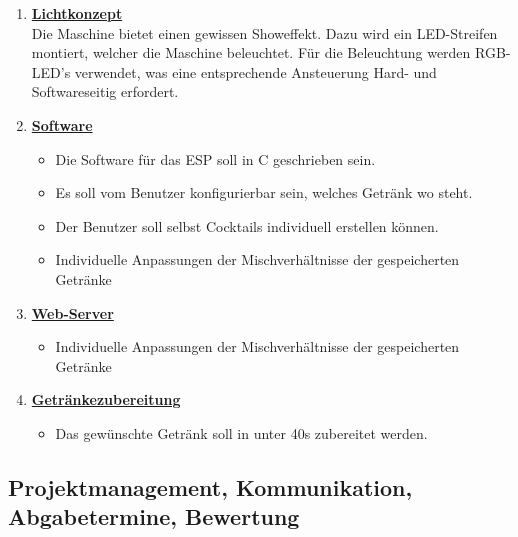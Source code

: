 \begin{enumerate}

\item \underline{\textbf{Lichtkonzept}}\mbox{}\\

Die Maschine bietet einen gewissen Showeffekt. Dazu wird ein LED-Streifen montiert, welcher die Maschine beleuchtet. Für die Beleuchtung werden RGB-LED's verwendet, was eine entsprechende Ansteuerung Hard- und Softwareseitig erfordert.\\

\item \underline{\textbf{Software}}\mbox{}\\
\begin{itemize}
\item Die Software für das ESP soll in C geschrieben sein.
\item Es soll vom Benutzer konfigurierbar sein, welches Getränk wo steht.
\item Der Benutzer soll selbst Cocktails individuell erstellen können.
\item Individuelle Anpassungen der Mischverhältnisse der gespeicherten Getränke \\ 
\end{itemize}

\item \underline{\textbf{Web-Server}}\mbox{}\\
\begin{itemize}
\item Individuelle Anpassungen der Mischverhältnisse der gespeicherten Getränke \\
\end{itemize}

\item \underline{\textbf{Getränkezubereitung}}\mbox{}\\
\begin{itemize}
\item Das gewünschte Getränk soll in unter 40s zubereitet werden. 
\end{itemize}

\end{enumerate}


\newpage

\subsection{Projektmanagement, Kommunikation, Abgabetermine, Bewertung}

